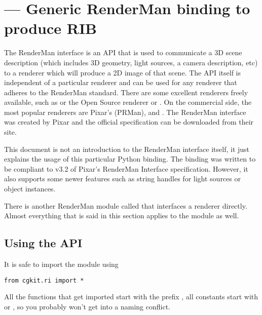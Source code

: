 \section{ ---
         Generic RenderMan binding to produce RIB}


The RenderMan\textsuperscript{\textregistered} interface is an API
that is used to communicate a 3D scene description (which includes 3D
geometry, light sources, a camera description, etc) to a renderer
which will produce a 2D image of that scene. The API itself is
independent of a particular renderer and can be used for any renderer
that adheres to the RenderMan standard.
There are some excellent renderers freely available, such
as  or the Open Source renderer 
 or
. On the
commercial side, the most popular renderers are Pixar's
 (PRMan), 
 and 
. 
The RenderMan interface was
created by Pixar and the official specification can be downloaded from
their site.

This document is not an introduction to the RenderMan interface
itself, it just explains the usage of this particular Python
binding. The binding was written to be compliant to v3.2 of Pixar's
RenderMan Interface specification. However, it also supports some
newer features such as string handles for light sources or object
instances.

There is another RenderMan module called  that
interfaces a renderer directly. Almost everything that is said in this section
applies to the  module as well.

\subsection{Using the API}

It is safe to import the module using 

\begin{verbatim}
from cgkit.ri import * 
\end{verbatim}

All the functions that get imported start with the prefix ,
all constants start with  or , so you probably
won't get into a naming conflict.

